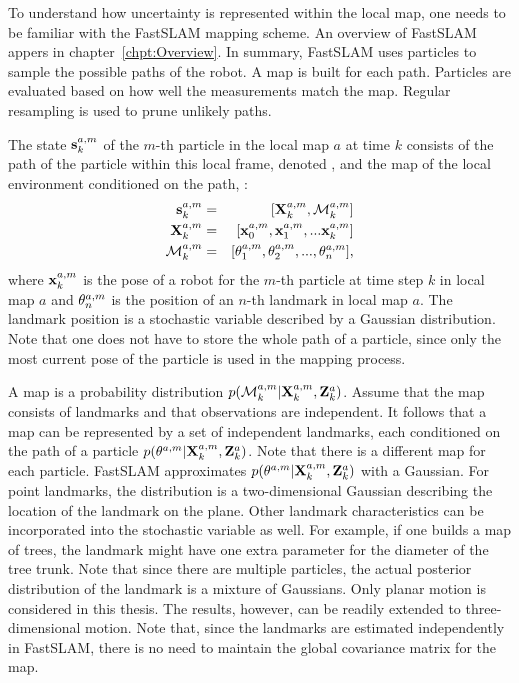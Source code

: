 To understand how uncertainty is represented within the local map, one
needs to be familiar with the FastSLAM \cite{Montemerlo02d} mapping
scheme.
An overview of FastSLAM appers in
chapter~\ref{chpt:Overview}. In summary, FastSLAM uses particles to
sample the possible paths of the robot. A map is built for each
path. Particles are evaluated based on how well the measurements match
the map.  Regular resampling is used to prune unlikely paths.

The state $\s{k}{a}{m}$ of the $m$-th particle in the local map $a$
at time $k$ consists of the path of the particle within this local
frame, denoted , and the map of the local environment
conditioned on the path, :
\begin{eqnarray}
 \s{k}{a}{m}    &=& [\Xall{k}{a}{m}, \map{k}{a}{m} ] \nonumber \\ 
 \Xall{k}{a}{m} &=& [\x{0}{a}{m}, \x{1}{a}{m}, ... \x{k}{a}{m}] \nonumber \\ 
 \map{k}{a}{m}  &=& [\mape{a}{m}{1}, \mape{a}{m}{2}, ..., \mape{a}{m}{n}], \nonumber
\end{eqnarray}
where $\x{k}{a}{m}$ is the pose of a robot for the $m$-th particle at
time step $k$ in local map $a$ and $\mape{a}{m}{n}$ is the position of
an $n$-th landmark in local map $a$. The landmark position is a
stochastic variable described by a Gaussian distribution. Note that
one does not have to store the whole path of a particle, since only
the most current pose of the particle is used in the mapping process.

A map is a probability distribution
$p(\map{k}{a}{m}|\Xall{k}{a}{m},\Zall{k}{a})$. Assume that the map consists of 
landmarks and that observations are independent. It follows that a map can be represented 
by a set of independent landmarks, each conditioned on the path of a particle
$p(\mape{a}{m}{}|\Xall{k}{a}{m},\Zall{k}{a})$. Note that there is a
different map for each particle. FastSLAM approximates
$p(\mape{a}{m}{}|\Xall{k}{a}{m},\Zall{k}{a})$ with a Gaussian.  For
point landmarks, the distribution is a two-dimensional Gaussian
describing the location of the landmark on the plane. Other landmark
characteristics can be incorporated into the stochastic
variable as well. For example, if one builds a map of trees, the landmark
might have one extra parameter for the diameter of the tree trunk.
Note that since there are multiple particles, the actual posterior
distribution of the landmark is a mixture of Gaussians. 
Only planar motion is considered in this thesis. The results,
however, can be readily extended to three-dimensional motion. Note
that, since the landmarks are estimated independently in FastSLAM,
there is no need to maintain the global covariance matrix for the
map.

